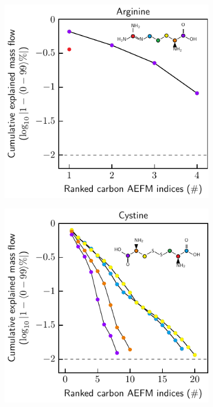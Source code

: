 \documentclass[]{article}
\begin{document}
\begin{figure}
    \begin{subfigure}[t]{0.247\textwidth}
        \caption{}
        \includegraphics[width=\textwidth]{subpanels/cumulative-source-met-6-log.pdf}\\
    \end{subfigure}
    \begin{subfigure}[t]{0.247\textwidth}
        \caption{}
        \includegraphics[width=\textwidth]{subpanels/cumulative-source-met-10-log.pdf}\\

\end{subfigure}
\end{figure}
\end{document}
